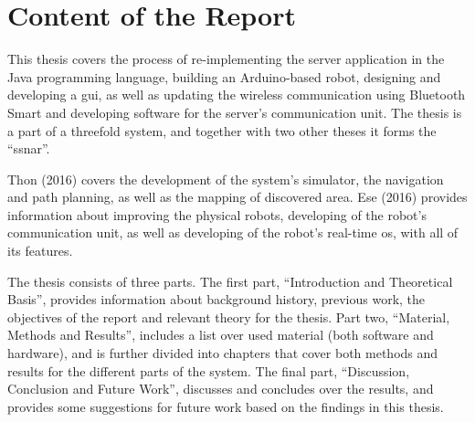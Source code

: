 \newpage
\section{Content of the Report}

This thesis covers the process of re-implementing the server application in the Java programming language, building an Arduino-based robot, designing and developing a \acrfull{gui}, as well as updating the wireless communication using Bluetooth Smart and developing software for the server's communication unit. The thesis is a part of a threefold system, and together with two other theses it forms the ``\acrfull{ssnar}''.

Thon (2016) covers the development of the system's simulator, the navigation and path planning, as well as the mapping of discovered area. Ese (2016) provides information about improving the physical robots, developing of the robot's communication unit, as well as developing of the robot's real-time \acrshort{os}, with all of its features.

The thesis consists of three parts. The first part, ``Introduction and Theoretical Basis'', provides information about background history, previous work, the objectives of the report and relevant theory for the thesis. Part two, ``Material, Methods and Results'', includes a list over used material (both software and hardware), and is further divided into chapters that cover both methods and results for the different parts of the system. The final part, ``Discussion, Conclusion and Future Work'', discusses and concludes over the results, and provides some suggestions for future work based on the findings in this thesis.